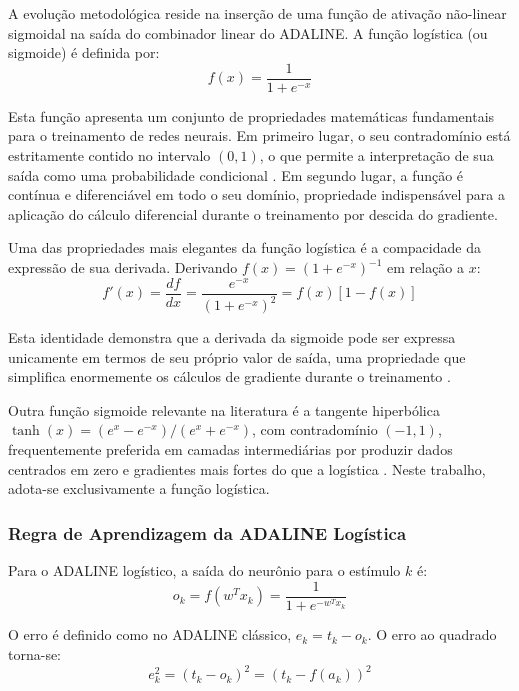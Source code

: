 A evolução metodológica reside na inserção de uma função de ativação não-linear sigmoidal na saída do combinador linear do ADALINE. A função logística (ou sigmoide) é definida por:
\begin{equation}
f(x) = \frac{1}{1 + e^{-x}}
\end{equation}

Esta função apresenta um conjunto de propriedades matemáticas fundamentais para o treinamento de redes neurais. Em primeiro lugar, o seu contradomínio está estritamente contido no intervalo $(0, 1)$, o que permite a interpretação de sua saída como uma probabilidade condicional \cite{abdi2006}. Em segundo lugar, a função é contínua e diferenciável em todo o seu domínio, propriedade indispensável para a aplicação do cálculo diferencial durante o treinamento por descida do gradiente.

Uma das propriedades mais elegantes da função logística é a compacidade da expressão de sua derivada. Derivando $f(x) = (1 + e^{-x})^{-1}$ em relação a $x$:
\begin{equation}
f'(x) = \frac{df}{dx} = \frac{e^{-x}}{(1 + e^{-x})^2} = f(x)[1 - f(x)]
\end{equation}

Esta identidade demonstra que a derivada da sigmoide pode ser expressa unicamente em termos de seu próprio valor de saída, uma propriedade que simplifica enormemente os cálculos de gradiente durante o treinamento \cite{silva2016}.

Outra função sigmoide relevante na literatura é a tangente hiperbólica $\tanh(x) = (e^x - e^{-x})/(e^x + e^{-x})$, com contradomínio $(-1, 1)$, frequentemente preferida em camadas intermediárias por produzir dados centrados em zero e gradientes mais fortes do que a logística \cite{braga2007}. Neste trabalho, adota-se exclusivamente a função logística.

\subsubsection{Regra de Aprendizagem da ADALINE Logística}

Para o ADALINE logístico, a saída do neurônio para o estímulo $k$ é:
\begin{equation}
o_k = f(w^T x_k) = \frac{1}{1 + e^{-w^T x_k}}
\end{equation}

O erro é definido como no ADALINE clássico, $e_k = t_k - o_k$. O erro ao quadrado torna-se:
\begin{equation}
e_k^2 = (t_k - o_k)^2 = (t_k - f(a_k))^2
\end{equation}


